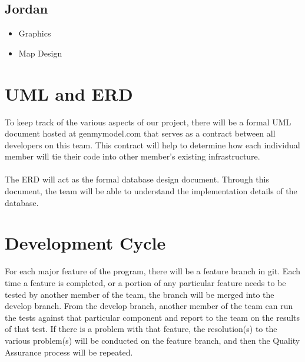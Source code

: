 \documentclass[12pt, a4paper, oneside]{article}
\begin{document}
\subsection*{Jordan}

\begin{itemize}
\item Graphics
\item Map Design
\end{itemize}

\section*{UML and ERD}
To keep track of the various aspects of our project, there will be a formal UML document hosted at genmymodel.com that serves as a contract between all developers on this team. This contract will help to determine how each individual member will tie their code into other member's existing infrastructure. \\\\
The ERD will act as the formal database design document. Through this document, the team will be able to understand the implementation details of the database.

\section*{Development Cycle}
For each major feature of the program, there will be a feature branch in git. Each time a feature is completed, or a portion of any particular feature needs to be tested by another member of the team, the branch will be merged into the develop branch. From the develop branch, another member of the team can run the tests against that particular component and report to the team on the results of that test. If there is a problem with that feature, the resolution(s) to the various problem(s) will be conducted on the feature branch, and then the Quality Assurance process will be repeated.
\end{document}
